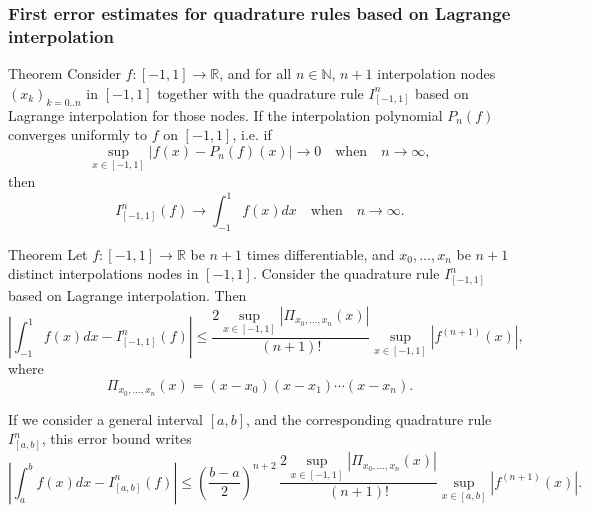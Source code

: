 \documentclass{article}
\begin{document}
        \subsubsection{First error estimates for quadrature rules based on Lagrange interpolation}

        \vspace{10pt}

        \begin{theorem}{Theorem}
            Consider $f: [-1,1]\to \mathbb{R}$, and for all $n\in\mathbb{N}$, $n+1$ interpolation nodes $(x_k)_{k=0..n}$ in $[-1,1]$ together with the quadrature rule $I^n_{[-1,1]}$ based on Lagrange interpolation for those nodes. If the interpolation polynomial $P_n(f)$ converges uniformly to $f$ on $[-1,1]$, i.e. if
            $$
            \sup_{x\in[-1,1]} |f(x) - P_n(f)(x)| \rightarrow 0 \quad{} \text{when} \quad{} n\rightarrow \infty,
            $$
            then
            $$I^n_{[-1,1]} (f) \rightarrow  \int_{-1}^1 f(x) dx  \quad{} \text{when} \quad{} n\rightarrow \infty.
            $$ 
        \end{theorem}

        \begin{theorem}{Theorem}
            Let $f : [-1,1] \to \mathbb{R}$ be $n+1$ times differentiable, and $x_0,\ldots,x_n$ be $n+1$ distinct interpolations nodes in $[-1,1]$. Consider the quadrature rule $I^n_{[-1,1]}$ based on Lagrange interpolation. Then
            $$\left\vert  \int_{-1}^1 f(x) dx - I^n_{[-1,1]} (f) \right\vert  \leq  \frac{2\sup_{x\in [-1,1]} \left\vert \Pi_{x_0,\ldots,x_n}(x) \right\vert }{(n+1)!} \sup_{x\in [-1,1]} \left\vert f^{(n+1)}(x) \right\vert, 
            $$ 
            where
            $$
            \Pi_{x_0,\ldots,x_n}(x) = (x-x_0)(x-x_1)\cdots(x-x_n).
            $$
        \end{theorem}

        \vspace{10pt}

        \begin{remark}
        If we consider a general interval $[a,b]$, and the corresponding quadrature rule $I^n_{[a,b]}$, this error bound writes
        $$\left\vert  \int_{a}^b f(x) dx - I^n_{[a,b]} (f) \right\vert  \leq \left(\frac{b-a}{2}\right)^{n+2} \, \frac{2\sup_{x\in [-1,1]} \left\vert \Pi_{x_0,\ldots, x_n}(x) \right\vert }{(n+1)!} \sup_{x\in [a,b]} \left\vert f^{(n+1)}(x) \right\vert.
        $$ 
        \end{remark}
\end{document}
